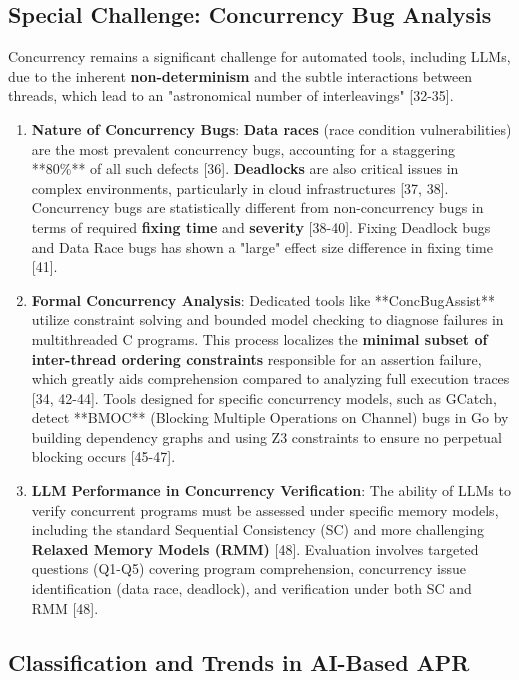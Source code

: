 \subsection{Special Challenge: Concurrency Bug Analysis}
\label{ssec:concurrency}

Concurrency remains a significant challenge for automated tools, including LLMs, due to the inherent \textbf{non-determinism} and the subtle interactions between threads, which lead to an "astronomical number of interleavings" [32-35].

\begin{enumerate}
    \item \textbf{Nature of Concurrency Bugs}:
    \textbf{Data races} (race condition vulnerabilities) are the most prevalent concurrency bugs, accounting for a staggering **80\%** of all such defects [36]. \textbf{Deadlocks} are also critical issues in complex environments, particularly in cloud infrastructures [37, 38]. Concurrency bugs are statistically different from non-concurrency bugs in terms of required \textbf{fixing time} and \textbf{severity} [38-40]. Fixing Deadlock bugs and Data Race bugs has shown a "large" effect size difference in fixing time [41].

    \item \textbf{Formal Concurrency Analysis}:
    Dedicated tools like **ConcBugAssist** utilize constraint solving and bounded model checking to diagnose failures in multithreaded C programs. This process localizes the \textbf{minimal subset of inter-thread ordering constraints} responsible for an assertion failure, which greatly aids comprehension compared to analyzing full execution traces [34, 42-44]. Tools designed for specific concurrency models, such as GCatch, detect **BMOC** (Blocking Multiple Operations on Channel) bugs in Go by building dependency graphs and using Z3 constraints to ensure no perpetual blocking occurs [45-47].

    \item \textbf{LLM Performance in Concurrency Verification}:
    The ability of LLMs to verify concurrent programs must be assessed under specific memory models, including the standard Sequential Consistency (SC) and more challenging \textbf{Relaxed Memory Models (RMM)} [48]. Evaluation involves targeted questions (Q1-Q5) covering program comprehension, concurrency issue identification (data race, deadlock), and verification under both SC and RMM [48].
\end{enumerate}

\subsection{Classification and Trends in AI-Based APR}


